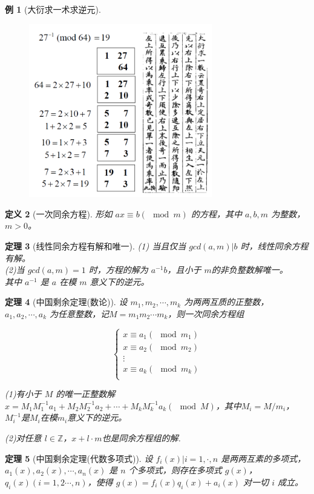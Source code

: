 \documentclass[12pt, a4paper, oneside]{ctexbook}
\newtheorem{theorem}{定理}[section]
\newtheorem{definition}[theorem]{定义}
\newtheorem{example}[theorem]{例}
\begin{document}
\begin{example}[大衍求一术求逆元]

    \begin{figure}[H]
        \centering
        \includegraphics[width=8cm]{assets/大衍求一术.png}
    \end{figure}

\end{example}
\begin{definition}[一次同余方程]
    形如 $ax\equiv b(\mod m)$ 的方程，其中 $a,b,m$ 为整数，$m>0$。
\end{definition}

\begin{theorem}[线性同余方程有解和唯一]    
(1) 当且仅当 $gcd(a,m)|b$ 时，线性同余方程有解。\\
(2)当 $gcd(a,m)=1$ 时，方程的解为 $a^{-1}b$，且小于 $m$的非负整数解唯一。\\
其中 $a^{-1}$ 是 $a$ 在模 $m$ 意义下的逆元。      
\end{theorem}

\begin{theorem}[中国剩余定理(数论)]
    设 $m_1,m_2,\cdots,m_k$ 为两两互质的正整数，$a_1,a_2,\cdots,a_k$ 为任意整数，记$M = m_1m_2\cdots m_k$，则一次同余方程组

    $$
    \begin{cases}
    x\equiv a_1(\mod m_1)\\
    x\equiv a_2(\mod m_2)\\
    \vdots\\
    x\equiv a_k(\mod m_k)\\
    \end{cases}
    $$

    (1)有小于 $M$ 的唯一正整数解$x=M_1M_1^{-1}a_1+M_2M_2^{-1}a_2+\cdots+M_kM_k^{-1}a_k(\mod M)$，其中$M_i=M/m_i$，$M_i^{-1}$是$M_i$在模$m_i$意义下的逆元。 
    
    (2)对任意 $l\in\mathbb{Z}$，$x+l\cdot m$也是同余方程组的解.
\end{theorem}
\begin{theorem}[中国剩余定理(代数多项式)]
    设 ${f_i(x)|i = 1,\cdot,n}$ 是两两互素的多项式， $a_1(x), a_2(x),\cdots,a_n(x)$ 是 $n$ 个多项式，则存在多项式 $g(x)$，$q_i(x)(i= 1,2\cdots, n)$，使得 $g(x) = f_i(x)q_i(x) + a_i(x)$ 对一切 $i$ 成立。   
\end{theorem}
\end{document}
